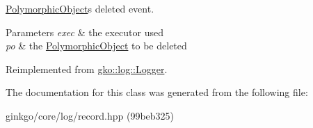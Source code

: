 \hyperlink{classgko_1_1PolymorphicObject}{Polymorphic\+Object}\textquotesingle{}s deleted event. 


\begin{DoxyParams}{Parameters}
{\em exec} & the executor used \\
\hline
{\em po} & the \hyperlink{classgko_1_1PolymorphicObject}{Polymorphic\+Object} to be deleted \\
\hline
\end{DoxyParams}


Reimplemented from \hyperlink{classgko_1_1log_1_1Logger}{gko\+::log\+::\+Logger}.



The documentation for this class was generated from the following file\+:\begin{DoxyCompactItemize}
\item 
ginkgo/core/log/record.\+hpp (99beb325)\end{DoxyCompactItemize}
